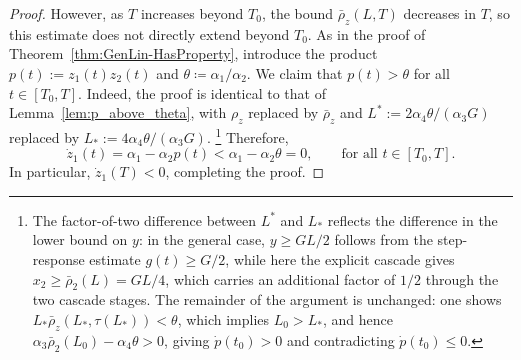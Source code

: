 \documentclass[10pt,a4paper]{amsart}
\begin{document}
\begin{proof}
However, as $T$ increases beyond $T_0$, the bound $\bar\rho_z(L,T)$
decreases in $T$, so this estimate does not directly extend beyond $T_0$.
As in the proof of Theorem~\ref{thm:GenLin-HasProperty}, introduce the product
$p(t):=z_1(t)z_2(t)$ and $\theta\coloneqq\alpha_1/\alpha_2$.
We claim that $p(t)>\theta$ for all $t\in[T_0,T]$.
Indeed, the proof is identical to that of Lemma~\ref{lem:p_above_theta}, with
$\rho_z$ replaced by $\bar\rho_z$ and
$L^*:=2\alpha_4\theta/(\alpha_3G)$ replaced by
$L_*:=4\alpha_4\theta/(\alpha_3G)$.
    \footnote{The factor-of-two difference 
    between $L^*$ and $L_*$ reflects the difference in the lower bound on $y$: 
    in the general case, $y\ge GL/2$ follows from the step-response estimate 
    $g(t)\ge G/2$, while here the explicit cascade gives 
    $x_2\ge\bar\rho_2(L)=GL/4$, 
    which carries an additional factor of $1/2$ through the two cascade stages. 
    The remainder of the argument is unchanged: one shows 
    $L_*\bar\rho_{z}(L_*,\tau(L_*))<\theta$, which implies $L_0>L_*$, and 
    hence $\alpha_3\bar\rho_2(L_0)-\alpha_4\theta>0$, giving 
    $\dot p(t_0)>0$ and contradicting $\dot p(t_0)\le 0$.}
Therefore,
\begin{equation*}
    \dot z_1(t) = \alpha_1-\alpha_2 p(t) < \alpha_1-\alpha_2\theta = 0,
    \qquad\text{for all } t\in[T_0,T].
\end{equation*}
In particular, $\dot z_1(T)<0$, completing the proof.
\end{proof}
\end{document}
